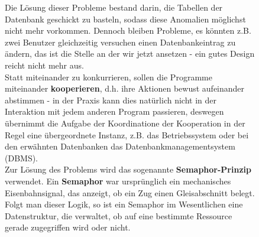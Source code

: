 \documentclass{article}
\begin{document}
\begin{figure}[H]
    \begin{minipage}{0.6\textwidth}
        Die Lösung dieser Probleme bestand darin, die Tabellen der Datenbank geschickt zu basteln, sodass diese Anomalien möglichst nicht mehr vorkommen. Dennoch bleiben Probleme, es könnten z.B. zwei Benutzer gleichzeitig versuchen einen Datenbankeintrag zu ändern, das ist die Stelle an der wir jetzt ansetzen - ein gutes Design reicht nicht mehr aus. \\
Statt miteinander zu konkurrieren, sollen die Programme miteinander \textbf{kooperieren}, d.h. ihre Aktionen bewust aufeinander abstimmen - in der Praxis kann dies natürlich nicht in der Interaktion mit jedem anderen Program passieren, deswegen übernimmt die Aufgabe der Koordinatione der Kooperation in der Regel eine übergeordnete Instanz, z.B. das Betriebssystem oder bei den erwähnten Datenbanken das Datenbankmanagementsystem (DBMS). \\
        Zur Lösung des Problems wird das sogenannte \textbf{Semaphor-Prinzip} verwendet. Ein \textbf{Semaphor} war ursprünglich ein mechanisches Eisenbahnsignal, das anzeigt, ob ein Zug einen Gleisabschnitt belegt. Folgt man dieser Logik, so ist ein Semaphor im Wesentlichen eine Datenstruktur, die verwaltet, ob auf eine bestimmte Ressource gerade zugegriffen wird oder nicht. \\
        

\end{minipage}
\end{figure}
\end{document}
